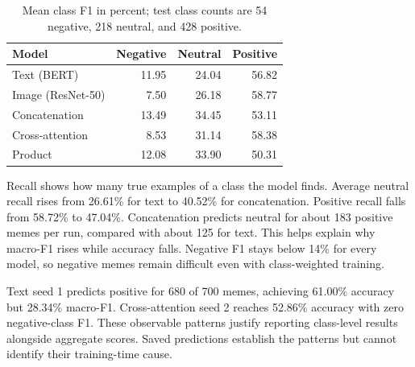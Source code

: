 \documentclass[11pt,a4paper]{article}
\begin{document}
\begin{table}[htbp]
\centering\small
\begin{tabular}{lrrr}
\toprule
Model & Negative & Neutral & Positive \\
\midrule
Text (BERT) & 11.95 & 24.04 & 56.82 \\
Image (ResNet-50) & 7.50 & 26.18 & 58.77 \\
Concatenation & 13.49 & 34.45 & 53.11 \\
Cross-attention & 8.53 & 31.14 & 58.38 \\
Product & 12.08 & 33.90 & 50.31 \\
\bottomrule
\end{tabular}
\caption{Mean class F1 in percent; test class counts are 54 negative, 218 neutral, and 428 positive.}
\label{tab:class}
\end{table}

Recall shows how many true examples of a class the model finds. Average neutral recall rises from 26.61\% for text to 40.52\% for concatenation. Positive recall falls from 58.72\% to 47.04\%. Concatenation predicts neutral for about 183 positive memes per run, compared with about 125 for text. This helps explain why macro-F1 rises while accuracy falls. Negative F1 stays below 14\% for every model, so negative memes remain difficult even with class-weighted training.

Text seed 1 predicts positive for 680 of 700 memes, achieving 61.00\% accuracy but 28.34\% macro-F1. Cross-attention seed 2 reaches 52.86\% accuracy with zero negative-class F1. These observable patterns justify reporting class-level results alongside aggregate scores. Saved predictions establish the patterns but cannot identify their training-time cause.
\end{document}
